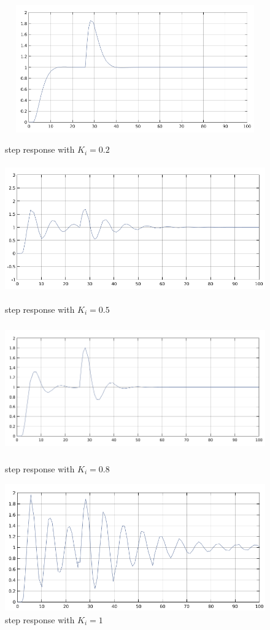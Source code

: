 \message{ !name(lab1.tex)}\documentclass[a4paper,12pt,openany]{book}
\begin{document}
\begin{figure}[H]
\includegraphics[width = 165mm, height=55mm, scale = 0.85]{lab03part22_ki_0_2.png}
 \caption{step response with $K_i= 0.2$}
 \includegraphics[width = 165mm, height =55mm, scale = 0.85]{lab03part23_k_i_0_5.png}
 \caption{step response with $K_i= 0.5$}
 \includegraphics[width = 165mm, height=55mm, scale = 0.85]{lab03part24_k_i_0_8.png}
 \caption{step response with $K_i= 0.8$}
 \includegraphics[width = 165mm, height=55mm, scale = 0.85]{lab03part25_k_i_1.png}
 \caption{step response with $K_i= 1$}
\end{figure}
\end{document}
